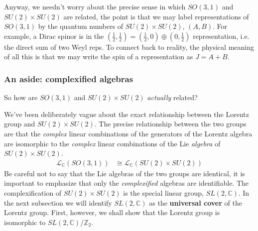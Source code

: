 \documentclass[12pt, oneside]{report}    %
\begin{document}
Anyway, we needn't worry about the precise sense in which $SO(3,1)$ and $SU(2)\times SU(2)$ are related, the point is that we may label representations of $SO(3,1)$ by the quantum numbers of $SU(2)\times SU(2)$, $(A,B)$. For example, a Dirac spinor is in the $(\frac 12, \frac 12)=(\frac 12, 0)\oplus (0,\frac 12)$ representation, i.e. the direct sum of two Weyl reps. 
To connect back to reality, the physical meaning of all this is that we may write the spin of a representation as $J=A+B$.


\subsubsection{An aside: complexified algebras}
So how are $SO(3,1)$ and $SU(2)\times SU(2)$ \textit{actually} related?

We've been deliberately vague about the exact relationship between the Lorentz group and $SU(2)\times SU(2)$. The precise relationship between the two groups are that the \textit{complex} linear combinations of the generators of the Lorentz algebra are isomorphic to the \textit{complex} linear combinations of the Lie \textit{algebra} of $SU(2)\times SU(2)$. 
    \begin{align}
        \mathcal L_{\mathbb{C}}(SO(3,1)) &\cong \mathcal L_{\mathbb{C}}(SU(2)\times SU(2))
    \end{align}
    Be careful not to say that the Lie algebras of the two groups are identical, it is important to emphasize that only the \textit{complexified} algebras are identifiable. 
    The complexification of $SU(2)\times SU(2)$ is the special linear group, $SL(2,\mathbb C)$. In the next subsection we will identify $SL(2,\mathbb C)$ as the \textbf{universal cover} of the Lorentz group. First, however, we shall show that the Lorentz group is isomorphic to $SL(2,\mathbb C)/\mathbb{Z}_2$. %
\end{document}
